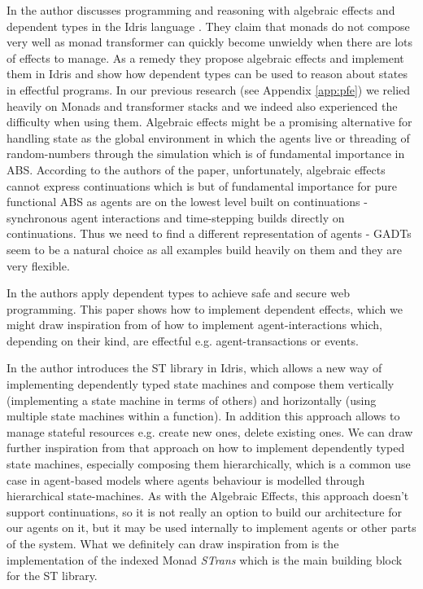 In \cite{brady_programming_2013} the author discusses programming and reasoning with algebraic effects and dependent types in the Idris language \cite{brady_idris_2013}. They claim that monads do not compose very well as monad transformer can quickly become unwieldy when there are lots of effects to manage. As a remedy they propose algebraic effects \cite{bauer_programming_2015} and implement them in Idris and show how dependent types can be used to reason about states in effectful programs. In our previous research (see Appendix \ref{app:pfe}) we relied heavily on Monads and transformer stacks and we indeed also experienced the difficulty when using them. Algebraic effects might be a promising alternative for handling state as the global environment in which the agents live or threading of random-numbers through the simulation which is of fundamental importance in ABS. According to the authors of the paper, unfortunately, algebraic effects cannot express continuations which is but of fundamental importance for pure functional ABS as agents are on the lowest level built on continuations - synchronous agent interactions and time-stepping builds directly on continuations. Thus we need to find a different representation of agents - GADTs seem to be a natural choice as all examples build heavily on them and they are very flexible.

In \cite{fowler_dependent_2014} the authors apply dependent types to achieve safe and secure web programming. This paper shows how to implement dependent effects, which we might draw inspiration from of how to implement agent-interactions which, depending on their kind, are effectful e.g. agent-transactions or events.

In \cite{brady_state_2016} the author introduces the ST library in Idris, which allows a new way of implementing dependently typed state machines and compose them vertically (implementing a state machine in terms of others) and horizontally (using multiple state machines within a function). In addition this approach allows to manage stateful resources e.g. create new ones, delete existing ones. We can draw further inspiration from that approach on how to implement dependently typed state machines, especially composing them hierarchically, which is a common use case in agent-based models where agents behaviour is modelled through hierarchical state-machines. As with the Algebraic Effects, this approach doesn't support continuations, so it is not really an option to build our architecture for our agents on it, but it may be used internally to implement agents or other parts of the system. What we definitely can draw inspiration from is the implementation of the indexed Monad \textit{STrans} which is the main building block for the ST library.

